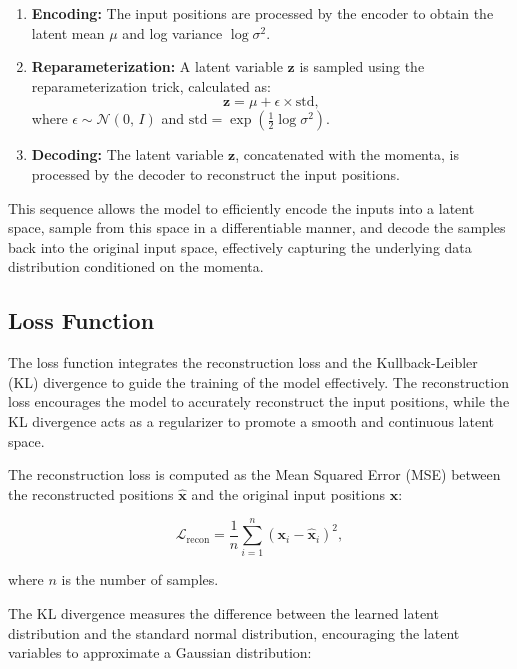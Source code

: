 \documentclass[11pt]{paper}
\begin{document}
\begin{enumerate}
    \item \textbf{Encoding:} The input positions are processed by the encoder to obtain the latent mean $\mu$ and log variance $\log\sigma^2$.
    \item \textbf{Reparameterization:} A latent variable $\mathbf{z}$ is sampled using the reparameterization trick, calculated as:
    \begin{equation}
    \mathbf{z} = \mu + \epsilon \times \text{std},
    \label{eq:latent_z_forward}
    \end{equation}
    where $\epsilon \sim \mathcal{N}(0,\,I)$ and $\text{std} = \exp\left(\frac{1}{2} \log\sigma^2\right)$.
    \item \textbf{Decoding:} The latent variable $\mathbf{z}$, concatenated with the momenta, is processed by the decoder to reconstruct the input positions.
\end{enumerate}

This sequence allows the model to efficiently encode the inputs into a latent space, sample from this space in a differentiable manner, and decode the samples back into the original input space, effectively capturing the underlying data distribution conditioned on the momenta.


\subsection{Loss Function}

The loss function integrates the reconstruction loss and the Kullback-Leibler (KL) divergence to guide the training of the model effectively. The reconstruction loss encourages the model to accurately reconstruct the input positions, while the KL divergence acts as a regularizer to promote a smooth and continuous latent space.

The reconstruction loss is computed as the Mean Squared Error (MSE) between the reconstructed positions $\mathbf{\hat{x}}$ and the original input positions $\mathbf{x}$:

\begin{equation}
\mathcal{L}_{\text{recon}} = \frac{1}{n} \sum_{i=1}^{n} \left( \mathbf{x}_i - \mathbf{\hat{x}}_i \right)^2,
\label{eq:reconstruction_loss}
\end{equation}

where $n$ is the number of samples.

The KL divergence measures the difference between the learned latent distribution and the standard normal distribution, encouraging the latent variables to approximate a Gaussian distribution:
\end{document}
